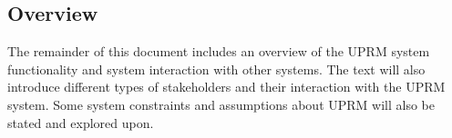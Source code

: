 	\subsection{Overview}
	The remainder of this document includes an overview of the UPRM system functionality and system interaction with other systems. The text will also introduce different types of stakeholders and their interaction with the UPRM system. Some system constraints and assumptions about UPRM will also be stated and explored upon.